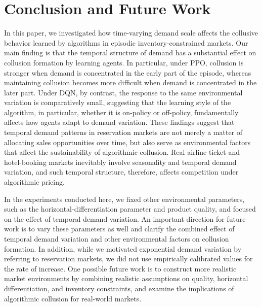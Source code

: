 \documentclass[runningheads]{llncs}
\begin{document}
\section{Conclusion and Future Work}

In this paper, we investigated how time-varying demand scale affects the collusive behavior learned by algorithms in episodic inventory-constrained markets.
Our main finding is that the temporal structure of demand has a substantial effect on collusion formation by learning agents.
In particular, under PPO, collusion is stronger when demand is concentrated in the early part of the episode, whereas maintaining collusion becomes more difficult when demand is concentrated in the later part.
Under DQN, by contrast, the response to the same environmental variation is comparatively small, suggesting that the learning style of the algorithm, in particular, whether it is on-policy or off-policy, fundamentally affects how agents adapt to demand variation.
%
These findings suggest that temporal demand patterns in reservation markets are not merely a matter of allocating sales opportunities over time, but also serve as environmental factors that affect the sustainability of algorithmic collusion.
Real airline-ticket and hotel-booking markets inevitably involve seasonality and temporal demand variation, and such temporal structure, therefore, affects competition under algorithmic pricing.

In the experiments conducted here, we fixed other environmental parameters, such as the horizontal-differentiation parameter and product quality, and focused on the effect of temporal demand variation.
An important direction for future work is to vary these parameters as well and clarify the combined effect of temporal demand variation and other environmental factors on collusion formation.
In addition, while we motivated exponential demand variation by referring to reservation markets, we did not use empirically calibrated values for the rate of increase.
One possible future work is to construct more realistic market environments by combining realistic assumptions on quality, horizontal differentiation, and inventory constraints, and examine the implications of algorithmic collusion for real-world markets.






\end{document}
